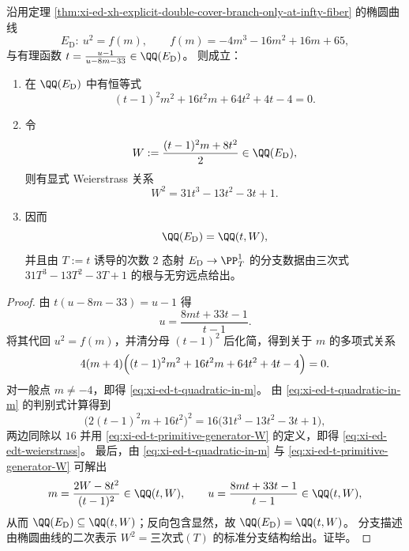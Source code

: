 \begin{theorem}\label{thm:xi-ed-t-quadratic-model-primitive-generator}
沿用定理 \ref{thm:xi-ed-xh-explicit-double-cover-branch-only-at-infty-fiber} 的椭圆曲线
\[
E_{\mathrm D}:\ u^2=f(m),\qquad f(m)=-4m^3-16m^2+16m+65,
\]
与有理函数
\(
t=\frac{u-1}{u-8m-33}\in\QQ(E_{\mathrm D})
\)。
则成立：
\begin{enumerate}
  \item 在 \(\QQ(E_{\mathrm D})\) 中有恒等式
  \begin{equation}\label{eq:xi-ed-t-quadratic-in-m}
  (t-1)^2m^2+16t^2m+64t^2+4t-4=0.
  \end{equation}
  \item 令
  \begin{equation}\label{eq:xi-ed-t-primitive-generator-W}
  W:=\frac{(t-1)^2m+8t^2}{2}\in\QQ(E_{\mathrm D}),
  \end{equation}
  则有显式 Weierstrass 关系
  \begin{equation}\label{eq:xi-ed-edt-weierstrass}
  W^2=31t^3-13t^2-3t+1.
  \end{equation}
  \item 因而
  \[
  \QQ(E_{\mathrm D})=\QQ(t,W),
  \]
  并且由 \(T:=t\) 诱导的次数 \(2\) 态射
  \(
  E_{\mathrm D}\to\PP^1_T
  \)
  的分支数据由三次式 \(31T^3-13T^2-3T+1\) 的根与无穷远点给出。
\end{enumerate}
\end{theorem}
\begin{proof}
由 \(t(u-8m-33)=u-1\) 得
\[
u=\frac{8mt+33t-1}{t-1}.
\]
将其代回 \(u^2=f(m)\)，并清分母 \((t-1)^2\) 后化简，得到关于 \(m\) 的多项式关系
\[
4(m+4)\Bigl((t-1)^2m^2+16t^2m+64t^2+4t-4\Bigr)=0.
\]
对一般点 \(m\neq -4\)，即得 \eqref{eq:xi-ed-t-quadratic-in-m}。
由 \eqref{eq:xi-ed-t-quadratic-in-m} 的判别式计算得到
\[
\bigl(2(t-1)^2m+16t^2\bigr)^2
=16\bigl(31t^3-13t^2-3t+1\bigr),
\]
两边同除以 \(16\) 并用 \eqref{eq:xi-ed-t-primitive-generator-W} 的定义，即得 \eqref{eq:xi-ed-edt-weierstrass}。
最后，由 \eqref{eq:xi-ed-t-quadratic-in-m} 与 \eqref{eq:xi-ed-t-primitive-generator-W} 可解出
\[
m=\frac{2W-8t^2}{(t-1)^2}\in\QQ(t,W),
\qquad
u=\frac{8mt+33t-1}{t-1}\in\QQ(t,W),
\]
从而 \(\QQ(E_{\mathrm D})\subseteq \QQ(t,W)\)；反向包含显然，故 \(\QQ(E_{\mathrm D})=\QQ(t,W)\)。
分支描述由椭圆曲线的二次表示 \(W^2=\text{三次式}(T)\) 的标准分支结构给出。证毕。
\end{proof}

